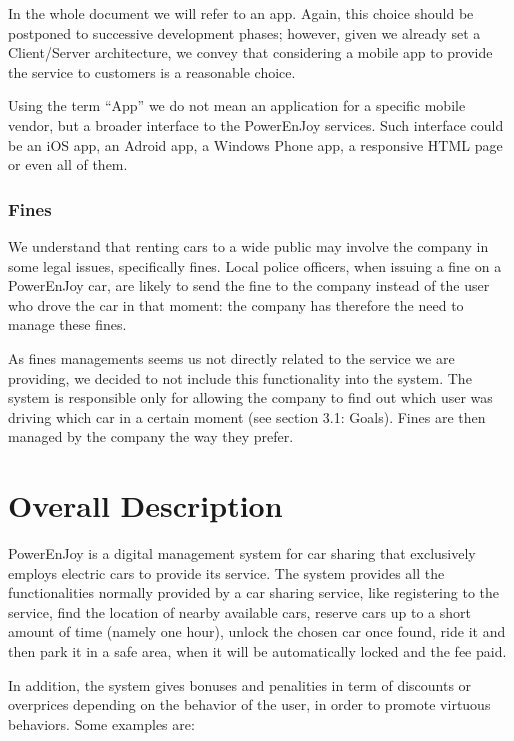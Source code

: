 \documentclass[11pt]{article} %
\newcommand{\pe}{PowerEnJoy }
\begin{document}
In the whole document we will refer to an app. Again, this choice should be postponed to successive development phases; however, given we already set a Client/Server architecture, we convey that considering a mobile app to provide the service to customers is a reasonable choice.

Using the term ``App'' we do not mean an application for a specific mobile vendor, but a broader interface to the \pe services. Such interface could be an iOS app, an Adroid app, a Windows Phone app, a responsive HTML page or even all of them.

\subsubsection{Fines}
We understand that renting cars to a wide public may involve the company in some legal issues, specifically fines. Local police officers, when issuing a fine on a \pe car, are likely to send the fine to the company instead of the user who drove the car in that moment: the company has therefore the need to manage these fines.

As fines managements seems us not directly related to the service we are providing, we decided to not include this functionality into the system. The system is responsible only for allowing the company to find out which user was driving which car in a certain moment (see section 3.1: Goals). Fines are then managed by the company the way they prefer.


\section{Overall Description}

\pe is a digital management system for car sharing that exclusively employs electric cars to provide its service. The system provides all the functionalities normally provided by a car sharing service, like registering to the service, find the location of nearby available cars, reserve cars up to a short amount of time (namely one hour), unlock the chosen car once found, ride it and then park it in a safe area, when it will be automatically locked and the fee paid.

In addition, the system gives bonuses and penalities in term of discounts or overprices depending on the behavior of the user, in order to promote virtuous behaviors. Some examples are:
\end{document}
